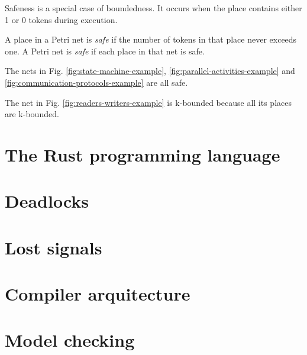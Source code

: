 Safeness is a special case of boundedness.
It occurs when the place contains either 1 or 0 tokens during execution.

\begin{definition}[Safeness]
    A place in a Petri net is \textit{safe} if the number of tokens in that place never exceeds one.
    A Petri net is \textit{safe} if each place in that net is safe.
\end{definition}

The nets in Fig. \ref{fig:state-machine-example}, \ref{fig:parallel-activities-example}
and \ref{fig:communication-protocols-example} are all safe.

The net in Fig. \ref{fig:readers-writers-example} is k-bounded because all its places are k-bounded.

\section{The Rust programming language}

\section{Deadlocks}

\section{Lost signals}

\section{Compiler arquitecture}

\section{Model checking}

\bigskip